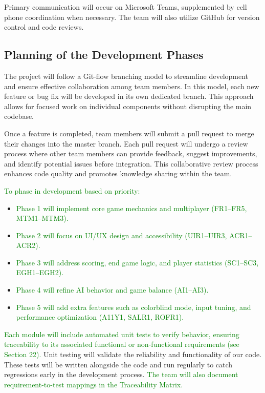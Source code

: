 \documentclass[12pt]{article}
\newcommand{\added}[1]{\textcolor{green}{#1}}
\begin{document}
Primary communication will occur on Microsoft Teams, supplemented by cell phone coordination when necessary. The team will also utilize GitHub for version control and code reviews.

\subsection{Planning of the Development Phases}
The project will follow a Git-flow branching model to streamline development and ensure effective collaboration among team members. In this model, each new feature or bug fix will be developed in its own dedicated branch. This approach allows for focused work on individual components without disrupting the main codebase.

Once a feature is completed, team members will submit a pull request to merge their changes into the master branch. Each pull request will undergo a review process where other team members can provide feedback, suggest improvements, and identify potential issues before integration. This collaborative review process enhances code quality and promotes knowledge sharing within the team.

\added{To phase in development based on priority:}
\begin{itemize}
    \item \added{Phase 1 will implement core game mechanics and multiplayer (FR1–FR5, MTM1–MTM3).}
    \item \added{Phase 2 will focus on UI/UX design and accessibility (UIR1–UIR3, ACR1–ACR2).}
    \item \added{Phase 3 will address scoring, end game logic, and player statistics (SC1–SC3, EGH1–EGH2).}
    \item \added{Phase 4 will refine AI behavior and game balance (AI1–AI3).}
    \item \added{Phase 5 will add extra features such as colorblind mode, input tuning, and performance optimization (A11Y1, SALR1, ROFR1).}
\end{itemize}

\added{Each module will include automated unit tests to verify behavior, ensuring traceability to its associated functional or non-functional requirements (see Section 22).} Unit testing will validate the reliability and functionality of our code. These tests will be written alongside the code and run regularly to catch regressions early in the development process. \added{The team will also document requirement-to-test mappings in the Traceability Matrix.}
\end{document}
